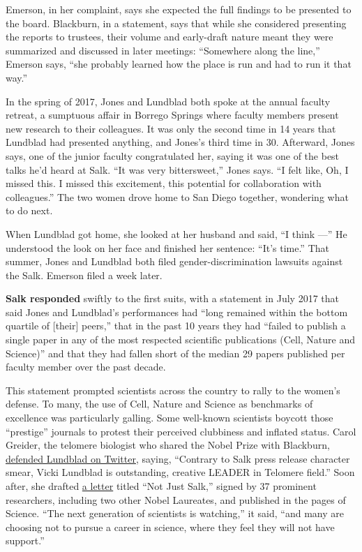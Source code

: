 Emerson, in her complaint, says she expected the full findings to be
presented to the board. Blackburn, in a statement, says that while she
considered presenting the reports to trustees, their volume and
early-draft nature meant they were summarized and discussed in later
meetings: ``Somewhere along the line,'' Emerson says, ``she probably
learned how the place is run and had to run it that way.''

In the spring of 2017, Jones and Lundblad both spoke at the annual
faculty retreat, a sumptuous affair in Borrego Springs where faculty
members present new research to their colleagues. It was only the second
time in 14 years that Lundblad had presented anything, and Jones's third
time in 30. Afterward, Jones says, one of the junior faculty
congratulated her, saying it was one of the best talks he'd heard at
Salk. ``It was very bittersweet,'' Jones says. ``I felt like, Oh, I
missed this. I missed this excitement, this potential for collaboration
with colleagues.'' The two women drove home to San Diego together,
wondering what to do next.

When Lundblad got home, she looked at her husband and said, ``I think
---'' He understood the look on her face and finished her sentence:
``It's time.'' That summer, Jones and Lundblad both filed
gender-discrimination lawsuits against the Salk. Emerson filed a week
later.

\textbf{Salk responded} swiftly to the first suits, with a statement in
July 2017 that said Jones and Lundblad's performances had ``long
remained within the bottom quartile of {[}their{]} peers,'' that in the
past 10 years they had ``failed to publish a single paper in any of the
most respected scientific publications (Cell, Nature and Science)'' and
that they had fallen short of the median 29 papers published per faculty
member over the past decade.

This statement prompted scientists across the country to rally to the
women's defense. To many, the use of Cell, Nature and Science as
benchmarks of excellence was particularly galling. Some well-known
scientists boycott those ``prestige'' journals to protest their
perceived clubbiness and inflated status. Carol Greider, the telomere
biologist who shared the Nobel Prize with Blackburn,
\href{https://twitter.com/CWGreider/status/886975788599320576}{defended
Lundblad on Twitter}, saying, ``Contrary to Salk press release character
smear, Vicki Lundblad is outstanding, creative LEADER in Telomere
field.'' Soon after, she drafted
\href{https://science.sciencemag.org/content/357/6356/1105}{a letter}
titled ``Not Just Salk,'' signed by 37 prominent researchers, including
two other Nobel Laureates, and published in the pages of Science. ``The
next generation of scientists is watching,'' it said, ``and many are
choosing not to pursue a career in science, where they feel they will
not have support.''


